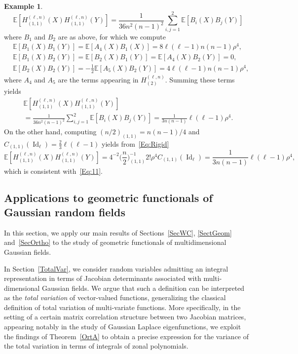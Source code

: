 \documentclass[10pt]{amsart}
\theoremstyle{definition}\newtheorem{defi}[theo]{Definition}\newtheorem{rema}[theo]{Remark}\newtheorem{exam}[theo]{Example}\newtheorem{exem}[theo]{Example}\newtheorem{nota}[theo]{Notation}
\DeclareMathOperator{\Id}{Id}
\newcommand{\E}[1]{\mathbb{E}\left[#1\right]}
\begin{document}
\begin{exam}
\[
\E{H_{(1,1)}^{(\ell,n)}(X)H_{(1,1)}^{(\ell,n)}(Y)} = \frac{1}{36n^2(n-1)^2}\sum_{i,j=1}^2\E{B_i(X)B_j(Y)}
\]
where $B_1$ and $B_2$ are as above, for which we compute
\begin{align*}
&\E{B_1(X)B_1(Y)} = \E{A_4(X)B_1(X)} = 8\ell (\ell-1)n(n-1)\rho^4, \\
&\E{B_1(X)B_2(Y)} = \E{B_2(X)B_1(Y)} = \E{A_4(X)B_2(Y)} = 0,\\
&\E{B_2(X)B_2(Y)} = -\frac{1}{2}\E{A_5(X)B_2(Y)} =4 \ell (\ell-1)n(n-1)\rho^4,
\end{align*}
where $A_4$ and $A_5$ are the terms appearing in $H_{(2)}^{(\ell,n)}$. Summing these terms yields
\begin{multline}\label{Eq:11}
\E{H_{(1,1)}^{(\ell,n)}(X)H_{(1,1)}^{(\ell,n)}(Y)}\\
= \frac{1}{36n^2(n-1)^2}\sum_{i,j=1}^2\E{B_i(X)B_j(Y)} = \frac{1}{3n(n-1)}\ell(\ell-1)\rho^4.
\end{multline}
On the other hand, computing $(n/2)_{(1,1)} = n(n-1)/4$ and $ C_{(1,1)}(\Id_{\ell}) = \frac{2}{3}\ell(\ell-1)$ yields from~\eqref{Eq:Rigid}
\[
\E{H_{(1,1)}^{(\ell,n)}(X)H_{(1,1)}^{(\ell,n)}(Y)} =4^{-2}\bigg(\frac{n}{2}\bigg)_{(1,1)}^{-1} 2 ! \rho^{4}C_{(1,1)}(\Id_{\ell}) =
\frac{1}{3n(n-1)}\ell(\ell-1)\rho^4,
\]
which is consistent with~\eqref{Eq:11}.
\end{exam}



\subsection{Applications to geometric functionals of Gaussian random fields}\label{SecApp}

In this section, we apply our main results of Sections~\ref{SecWC}, \ref{SectGeom} and~\ref{SecOrtho} to the study of geometric functionals of multidimensional Gaussian fields.

In Section~\ref{TotalVar}, we consider random variables admitting an integral representation in terms of Jacobian determinants associated with multi-dimensional Gaussian fields. We argue that such a definition can be interpreted as the \emph{total variation} of vector-valued functions, generalizing the classical definition of total variation of multi-variate functions. More specifically, in the setting of a certain matrix correlation structure between two Jacobian matrices, appearing notably in the study of Gaussian Laplace eigenfunctions, we exploit the findings of Theorem~\ref{OrtA} to obtain a precise expression for the variance of the total variation in terms of integrals of zonal polynomials.
\end{document}
